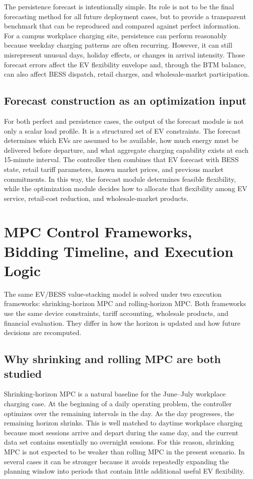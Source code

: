 \documentclass[final,5p,times]{elsarticle}
\begin{document}
The persistence forecast is intentionally simple. Its role is not to be the final forecasting method for all future deployment cases, but to provide a transparent benchmark that can be reproduced and compared against perfect information. For a campus workplace charging site, persistence can perform reasonably because weekday charging patterns are often recurring. However, it can still misrepresent unusual days, holiday effects, or changes in arrival intensity. Those forecast errors affect the EV flexibility envelope and, through the BTM balance, can also affect BESS dispatch, retail charges, and wholesale-market participation.

\subsection{Forecast construction as an optimization input}
For both perfect and persistence cases, the output of the forecast module is not only a scalar load profile. It is a structured set of EV constraints. The forecast determines which EVs are assumed to be available, how much energy must be delivered before departure, and what aggregate charging capability exists at each 15-minute interval. The controller then combines that EV forecast with BESS state, retail tariff parameters, known market prices, and previous market commitments. In this way, the forecast module determines feasible flexibility, while the optimization module decides how to allocate that flexibility among EV service, retail-cost reduction, and wholesale-market products.
\section{MPC Control Frameworks, Bidding Timeline, and Execution Logic}
The same EV/BESS value-stacking model is solved under two execution frameworks: shrinking-horizon MPC and rolling-horizon MPC. Both frameworks use the same device constraints, tariff accounting, wholesale products, and financial evaluation. They differ in how the horizon is updated and how future decisions are recomputed.

\subsection{Why shrinking and rolling MPC are both studied}
Shrinking-horizon MPC is a natural baseline for the June--July workplace charging case. At the beginning of a daily operating problem, the controller optimizes over the remaining intervals in the day. As the day progresses, the remaining horizon shrinks. This is well matched to daytime workplace charging because most sessions arrive and depart during the same day, and the current data set contains essentially no overnight sessions. For this reason, shrinking MPC is not expected to be weaker than rolling MPC in the present scenario. In several cases it can be stronger because it avoids repeatedly expanding the planning window into periods that contain little additional useful EV flexibility.
\end{document}

